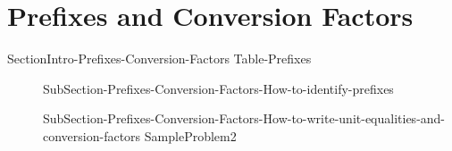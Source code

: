 \documentclass[main.tex]{subfiles}
\begin{document}
\section{\faGears Prefixes and Conversion Factors}

{SectionIntro-Prefixes-Conversion-Factors}
{Table-Prefixes}
\sloppy\begin{description}
\item[]{SubSection-Prefixes-Conversion-Factors-How-to-identify-prefixes}
\item[]{SubSection-Prefixes-Conversion-Factors-How-to-write-unit-equalities-and-conversion-factors}
{SampleProblem2}
\end{description}



 



\end{document}
